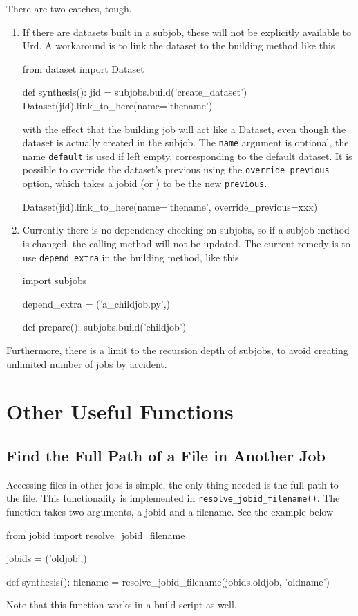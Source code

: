There are two catches, tough.
\begin{enumerate}
  \item
If there are datasets built in a subjob,
these will not be explicitly available to Urd.  A workaround is to
link the dataset to the building method like this
\begin{python}
from dataset import Dataset

def synthesis():
    jid = subjobs.build('create_dataset')
    Dataset(jid).link_to_here(name='thename')
\end{python}
with the effect that the building job will act like a Dataset, even
though the dataset is actually created in the subjob.  The
\texttt{name} argument is optional, the name \texttt{default} is used
if left empty, corresponding to the default dataset.  It is possible
to override the dataset's previous using
the \texttt{override\_previous} option, which takes a jobid
(or \pyNone) to be the new \texttt{previous}.
\begin{python}
Dataset(jid).link_to_here(name='thename', override_previous=xxx)
\end{python}


\item
Currently there is no dependency checking on subjobs, so if a subjob
method is changed, the calling method will not be updated.  The
current remedy is to use \texttt{depend\_extra} in the building
method, like this
\begin{python}
import subjobs

depend_extra = ('a_childjob.py',)

def prepare():
  subjobs.build('childjob')
\end{python}
\end{enumerate}
Furthermore, there is a limit to the recursion depth of subjobs, to
avoid creating unlimited number of jobs by accident.


\clearpage
\section{Other Useful Functions}

\subsection{Find the Full Path of a File in Another Job}
Accessing files in other jobs is simple, the only thing needed is the
full path to the file.  This functionality is implemented
in \texttt{resolve\_jobid\_filename()}.  The function takes two
arguments, a jobid and a filename.  See the example below
\begin{python}
from jobid import resolve_jobid_filename

jobids = ('oldjob',)

def synthesis():
    filename = resolve_jobid_filename(jobids.oldjob, 'oldname')
\end{python}
Note that this function works in a build script as well.




